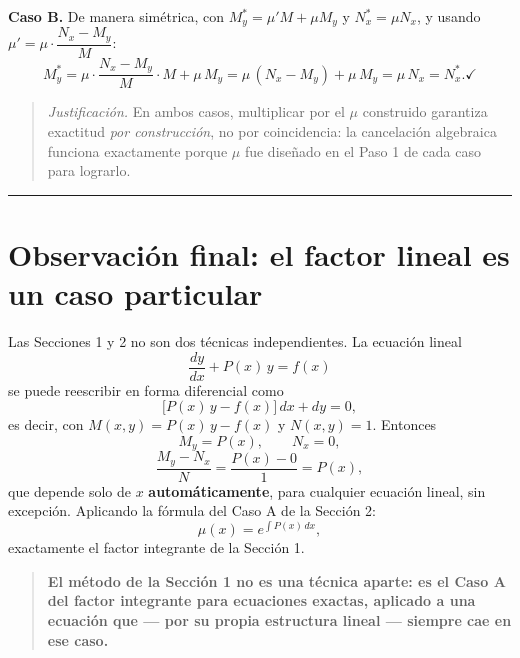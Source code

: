 \documentclass[12pt,letterpaper]{article}
\newcommand{\justif}[1]{%
  \par\noindent
  {\small\color{JustifColor}%
  \begin{quote}
  \textit{Justificación.} #1
  \end{quote}}%
}
\newenvironment{resultado}
  {\begin{quote}\color{ResultColor}\bfseries}
  {\end{quote}}
\begin{document}
\textbf{Caso B.} De manera simétrica, con $M^{*}_y = \mu' M + \mu M_y$ y
$N^{*}_x = \mu N_x$, y usando $\mu' = \mu\cdot\dfrac{N_x-M_y}{M}$:
\[
M^{*}_y
= \mu\cdot\frac{N_x-M_y}{M}\cdot M + \mu\,M_y
= \mu\,(N_x-M_y) + \mu\,M_y
= \mu\,N_x
= N^{*}_x. \checkmark
\]

\justif{En ambos casos, multiplicar por el $\mu$ construido garantiza
exactitud \emph{por construcción}, no por coincidencia: la cancelación
algebraica funciona exactamente porque $\mu$ fue diseñado en el Paso 1 de
cada caso para lograrlo.}

\bigskip
\hrule
\bigskip

\section{Observación final: el factor lineal es un caso particular}

Las Secciones 1 y 2 no son dos técnicas independientes. La ecuación lineal
\[
\frac{dy}{dx} + P(x)\,y = f(x)
\]
se puede reescribir en forma diferencial como
\[
\big[P(x)\,y - f(x)\big]\,dx + dy = 0,
\]
es decir, con $M(x,y) = P(x)\,y - f(x)$ y $N(x,y) = 1$. Entonces
\[
M_y = P(x), \qquad N_x = 0,
\]
\[
\frac{M_y - N_x}{N} = \frac{P(x) - 0}{1} = P(x),
\]
que depende solo de $x$ \textbf{automáticamente}, para cualquier ecuación
lineal, sin excepción. Aplicando la fórmula del Caso A de la Sección 2:
\[
\mu(x) = e^{\int P(x)\,dx},
\]
exactamente el factor integrante de la Sección 1.

\begin{resultado}
El método de la Sección 1 no es una técnica aparte: es el Caso A del factor
integrante para ecuaciones exactas, aplicado a una ecuación que --- por su
propia estructura lineal --- siempre cae en ese caso.
\end{resultado}
\end{document}
